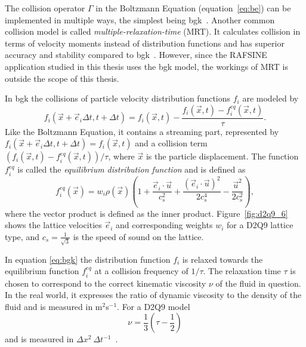 The collision operator $\Gamma$ in the Boltzmann Equation (equation~\ref{eq:be}) can be implemented in multiple ways, the simplest being \gls{bgk}~\cites[pg.35]{lbm2}. Another common collision model is called \textit{multiple-relaxation-time} (MRT). It calculates collision in terms of velocity moments instead of distribution functions and has superior accuracy and stability compared to \gls{bgk}~\cites[pg.25]{Delbosc}. However, since the RAFSINE application studied in this thesis uses the \gls{bgk} model, the workings of MRT is outside the scope of this thesis.

In \gls{bgk} the collisions of particle velocity distribution functions $f_i$ are modeled by
\begin{equation}\label{eq:bgk}
f_i(\vec{x}+\vec{e}_i \Delta t, t+\Delta t) = f_i(\vec{x},t) - \frac{ f_i(\vec{x},t)-f_i^{eq}(\vec{x},t)}{\tau}.
\end{equation}
Like the Boltzmann Equation, it contains a streaming part, represented by  $f_i(\vec{x}+\vec{e}_i \Delta t, t+\Delta t) = f_i(\vec{x},t)$ and a collision term $(f_i(\vec{x},t)-f_i^{eq}(\vec{x},t))/\tau$, where $\vec{x}$ is the particle displacement. The function $f_i^{eq}$ is called the \textit{equilibrium distribution function} and is defined as~\cites[pg.35]{lbm2}
\begin{equation}\label{eq:bgk_feq}
f_i^{eq}(\vec{x}) = w_i \rho(\vec{x}) \left(1 + \frac{\vec{e}_i \cdot \vec{u}}{c_s^2} + \frac{(\vec{e}_i \cdot \vec{u})^2}{2c_s^4} - \frac{\vec{u}^2}{2c_s^2} \right), 
\end{equation}
where the vector product is defined as the inner product. Figure~\ref{fig:d2q9_6} shows the lattice velocities $\vec{e}_i$ and corresponding weights $w_i$ for a D2Q9 lattice type, and $c_s = \frac{1}{\sqrt 3}$ is the speed of sound on the lattice. 

In equation \ref{eq:bgk} the distribution function $f_i$ is relaxed towards the equilibrium function $f_i^{eq}$ at a collision frequency of $1/\tau$. The relaxation time $\tau$ is chosen to correspond to the correct kinematic viscosity $\nu$ of the fluid in question. In the real world, it expresses the ratio of dynamic viscosity to the density of the fluid and is measured in m$^2$s$^{-1}$. For a D2Q9 model
\begin{equation}\label{eq:tau}
\nu = \frac{1}{3}\left(\tau-\frac{1}{2}\right)
\end{equation}
and is measured in $\Delta x^2~\Delta{t}^{-1}$~\cites[pg.39]{lbm2}.

